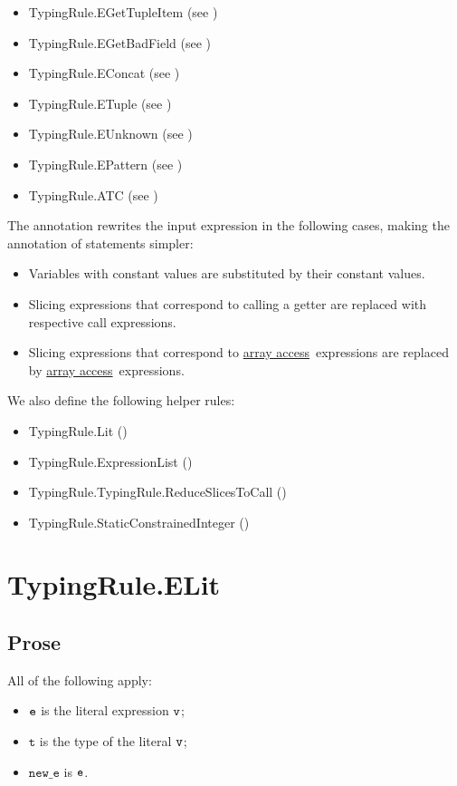\documentclass{book}
\newcommand\arrayaccess[0]{\hyperlink{def-arrayaccess}{array access}}
\newcommand\vt[0]{\texttt{t}}
\newcommand\newe[0]{\texttt{new\_e}}
\begin{document}
\begin{itemize}
\item TypingRule.EGetTupleItem (see )
\item TypingRule.EGetBadField (see )
\item TypingRule.EConcat (see )
\item TypingRule.ETuple (see )
\item TypingRule.EUnknown (see )
\item TypingRule.EPattern (see )
\item TypingRule.ATC (see )
\end{itemize}

The annotation rewrites the input expression in the following cases, making the annotation of statements simpler:
\begin{itemize}
  \item Variables with constant values are substituted by their constant values.
  \item Slicing expressions that correspond to calling a getter are replaced with respective call expressions.
  \item Slicing expressions that correspond to \arrayaccess\ expressions are replaced by \arrayaccess\ expressions.
\end{itemize}

We also define the following helper rules:
\begin{itemize}
  \item TypingRule.Lit ()
  \item TypingRule.ExpressionList ()
  \item TypingRule.TypingRule.ReduceSlicesToCall ()
  \item TypingRule.StaticConstrainedInteger ()
\end{itemize}

\section{TypingRule.ELit \label{sec:TypingRule.ELit}}
\subsection{Prose}
All of the following apply:
\begin{itemize}
\item $\texttt{e}$ is the literal expression $\texttt{v}$;
\item $\vt$ is the type of the literal $\texttt{v}$;
\item $\newe$ is $\texttt{e}$.
\end{itemize}
\end{document}
